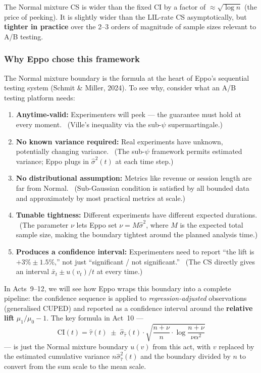 \documentclass[12pt, a4paper]{article}
\begin{document}
The Normal mixture CS is wider than the fixed CI by a factor of
$\approx\!\sqrt{\log n}$ (the price of peeking).  It is slightly wider than the
LIL-rate CS asymptotically, but \textbf{tighter in practice} over the 2--3
orders of magnitude of sample sizes relevant to A/B testing.

\subsubsection*{Why Eppo chose this framework}

The Normal mixture boundary is the formula at the heart of Eppo's sequential
testing system (Schmit \& Miller, 2024).  To see why, consider what an A/B
testing platform needs:

\begin{enumerate}[nosep]
  \item \textbf{Anytime-valid:} Experimenters will peek --- the guarantee must
        hold at every moment.  \checkmark\ (Ville's inequality via the
        sub-$\psi$ supermartingale.)
  \item \textbf{No known variance required:} Real experiments have unknown,
        potentially changing variance.  \checkmark\ (The sub-$\psi$ framework
        permits estimated variance; Eppo plugs in $\hat{\sigma}^2(t)$ at each
        time step.)
  \item \textbf{No distributional assumption:} Metrics like revenue or session
        length are far from Normal.  \checkmark\ (Sub-Gaussian condition is
        satisfied by all bounded data and approximately by most practical
        metrics at scale.)
  \item \textbf{Tunable tightness:} Different experiments have different
        expected durations.  \checkmark\ (The parameter $\nu$ lets Eppo set
        $\nu = M \hat{\sigma}^2$, where $M$ is the expected total sample size,
        making the boundary tightest around the planned analysis time.)
  \item \textbf{Produces a confidence interval:} Experimenters need to report
        ``the lift is $+3\% \pm 1.5\%$,'' not just ``significant / not
        significant.''  \checkmark\ (The CS directly gives an interval
        $\bar{x}_t \pm u(v_t)/t$ at every time.)
\end{enumerate}

In Acts~9--12, we will see how Eppo wraps this boundary into a complete
pipeline: the confidence sequence is applied to \emph{regression-adjusted}
observations (generalised CUPED) and reported as a confidence interval around
the \textbf{relative lift} $\mu_1/\mu_0 - 1$.  The key formula in Act~10 ---
\[
  \text{CI}(t) = \hat{\tau}(t) \;\pm\; \hat{\sigma}_{\hat{\tau}}(t) \cdot
  \sqrt{\frac{n + \nu}{n} \cdot \log\frac{n + \nu}{\nu \alpha^2}}
\]
--- is just the Normal mixture boundary $u(v)$ from this act, with $v$
replaced by the estimated cumulative variance $n \hat{\sigma}_{\hat{\tau}}^2(t)$
and the boundary divided by $n$ to convert from the sum scale to the mean
scale.
\end{document}
